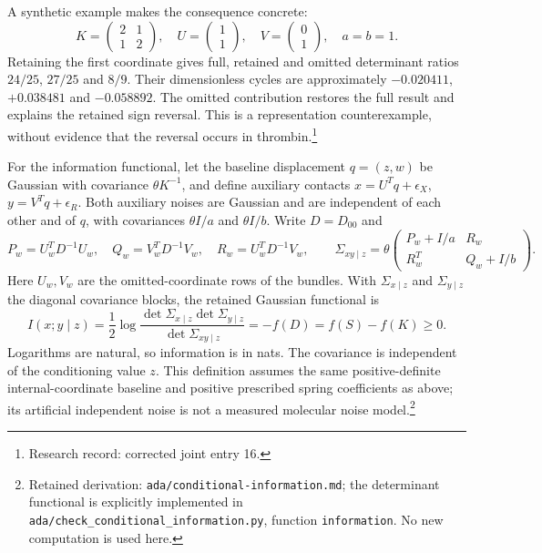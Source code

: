\documentclass{article}
\begin{document}
A synthetic example makes the consequence concrete:
\[
 K=\begin{pmatrix}2&1\\1&2\end{pmatrix},\quad
 U=\begin{pmatrix}1\\1\end{pmatrix},\quad
 V=\begin{pmatrix}0\\1\end{pmatrix},\quad a=b=1.
\]
Retaining the first coordinate gives full, retained and omitted determinant ratios \(24/25\), \(27/25\) and \(8/9\). Their dimensionless cycles are approximately \(-0.020411\), \(+0.038481\) and \(-0.058892\). The omitted contribution restores the full result and explains the retained sign reversal. This is a representation counterexample, without evidence that the reversal occurs in thrombin.\footnote{Research record: corrected joint entry 16.}

For the information functional, let the baseline displacement \(q=(z,w)\) be Gaussian with covariance \(\theta K^{-1}\), and define auxiliary contacts \(x=U^Tq+\epsilon_X\), \(y=V^Tq+\epsilon_R\). Both auxiliary noises are Gaussian and are independent of each other and of \(q\), with covariances \(\theta I/a\) and \(\theta I/b\). Write \(D=D_{00}\) and
\[
 P_w=U_w^TD^{-1}U_w,\quad Q_w=V_w^TD^{-1}V_w,\quad R_w=U_w^TD^{-1}V_w,
 \qquad
 \Sigma_{xy\mid z}=\theta\begin{pmatrix}P_w+I/a&R_w\\R_w^T&Q_w+I/b\end{pmatrix}.
\]
Here \(U_w,V_w\) are the omitted-coordinate rows of the bundles. With \(\Sigma_{x\mid z}\) and \(\Sigma_{y\mid z}\) the diagonal covariance blocks, the retained Gaussian functional is
\[
 I(x;y\mid z)=\frac12\log\frac{\det\Sigma_{x\mid z}\det\Sigma_{y\mid z}}
 {\det\Sigma_{xy\mid z}}=-f(D)=f(S)-f(K)\ge0.
\]
Logarithms are natural, so information is in nats. The covariance is independent of the conditioning value \(z\). This definition assumes the same positive-definite internal-coordinate baseline and positive prescribed spring coefficients as above; its artificial independent noise is not a measured molecular noise model.\footnote{Retained derivation: \texttt{ada/conditional-information.md}; the determinant functional is explicitly implemented in \texttt{ada/check\_conditional\_information.py}, function \texttt{information}. No new computation is used here.}
\end{document}
